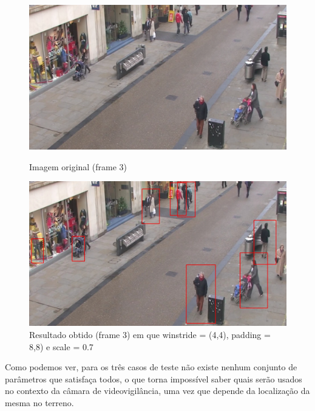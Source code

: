 \begin{figure}[h]
	\centering
	\begin{minipage}[b]{0.49\textwidth}
		\centering
		\includegraphics[width=\textwidth]{img/vision/exemplos/frame3.png}
		\caption[Imagem original (frame 3)]{Imagem original (frame 3) \newline \newline}
		\label{bluetth05-res}
	\end{minipage}
	\hfill
	\begin{minipage}[b]{0.49\textwidth}
		\centering
		\includegraphics[width=\textwidth]{img/vision/exemplos/result_frame3.jpg}
		\caption[Resultado obtido (frame 3)]{Resultado obtido (frame 3) em que winstride = (4,4), padding = 8,8) e scale = 0.7}
		\label{comimageesquema}
	\end{minipage}
\end{figure}



Como podemos ver, para os três casos de teste não existe nenhum conjunto de parâmetros que satisfaça todos, o que torna impossível saber quais serão usados no contexto da câmara de videovigilância, uma vez que depende da localização da mesma no terreno.  



